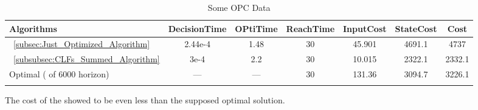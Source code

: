   \bgroup
 \begin{xltabular}{\textwidth}{|l|cccccc|}
   \toprule
   Algorithms   & DecisionTime & OPtiTime & ReachTime  & InputCost   & StateCost & Cost           \\
   \midrule
    ~\ref{subsec:Just_Optimized_Algorithm}           & 2.44e-4 & 1.48 & 30 & 45.901  & 4691.1  & 4737 \\
    ~\ref{subsubsec:CLFs_Summed_Algorithm}        & 3e-4 & 2.2     & 30 & 10.015 & 2322.1 &  2332.1 \\
    Optimal ( of 6000 horizon)                        & ---  & ---     & 30  & 131.36 & 3094.7 & 3226.1 \\
    \midrule
    \caption{Some OPC Data}
    \label{tab:Some_OPC_Data}\\
   \end{xltabular}
 \egroup


The cost of the  showed to be even less than the supposed optimal solution.




















